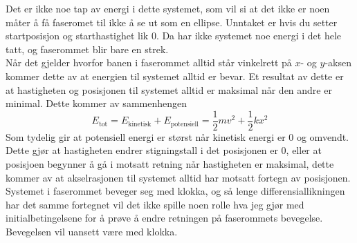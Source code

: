 \documentclass[11pt, A4paper,norsk]{article}
\begin{document}
			\begin{flushleft}
Det er ikke noe tap av energi i dette systemet, som vil si at det ikke er noen måter å få faseromet til ikke å se ut som en ellipse. Unntaket er hvis du setter startposisjon og starthastighet lik $0$. Da har ikke systemet noe energi i det hele tatt, og faserommet blir bare en strek. \\

Når det gjelder hvorfor banen i faserommet alltid står vinkelrett på $x$- og $y$-aksen kommer dette av at energien til systemet alltid er bevar. Et resultat av dette er at hastigheten og posisjonen til systemet alltid er maksimal når den andre er minimal. Dette kommer av sammenhengen
$$E_{\text{tot}} = E_{\text{kinetisk}} + E_{\text{potensiell}} = \frac{1}{2} m v^2 + \frac{1}{2} k x^2$$
Som tydelig gir at potensiell energi er størst når kinetisk energi er $0$ og omvendt. Dette gjør at hastigheten endrer stigningstall i det posisjonen er $0$, eller at posisjoen begynner å gå i motsatt retning når hastigheten er maksimal, dette kommer av at akselrasjonen til systemet alltid har motsatt fortegn av posisjonen. \\

Systemet i faserommet beveger seg med klokka, og så lenge differensiallikningen har det samme fortegnet vil det ikke spille noen rolle hva jeg gjør med initialbetingelsene for å prøve å endre retningen på faserommets bevegelse. Bevegelsen vil uansett være med klokka.
			\end{flushleft}
\end{document}
